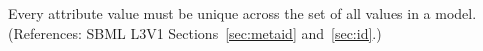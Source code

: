Every  attribute value must be unique across the set of all
 values in a model.  (References: SBML L3V1
Sections~\ref{sec:metaid} and~\ref{sec:id}.)
